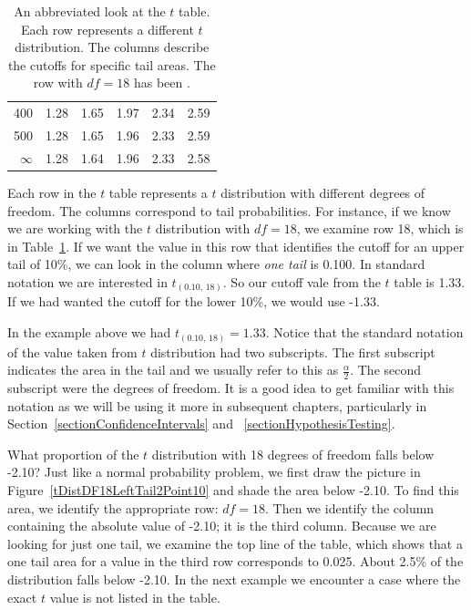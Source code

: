 \begin{table}[H]
\begin{tabular}{r | rrr rr}
400  &  {\normalsize  1.28} & {\normalsize  1.65} & {\normalsize  1.97} & {\normalsize  2.34} & {\normalsize  2.59}  \\ 
500  &  {\normalsize  1.28} & {\normalsize  1.65} & {\normalsize  1.96} & {\normalsize  2.33} & {\normalsize  2.59}  \\ 
$\infty$  &  {\normalsize  1.28} & {\normalsize  1.64} & {\normalsize  1.96} & {\normalsize  2.33} & {\normalsize  2.58}  \\ 
\end{tabular}
\caption{An abbreviated look at the $t$ table. Each row represents a different $t$ distribution. The columns describe the cutoffs for specific tail areas. The row with $df=18$ has been .}
\label{tTableSample}
\end{table}

Each row in the $t$ table represents a $t$ distribution with different degrees of freedom. The columns correspond to tail probabilities. For instance, if we know we are working with the $t$ distribution with $df=18$, 
we examine row 18, which is  in Table~\ref{tTableSample}. If we want the value in this row that identifies the cutoff for an upper tail of 10\%, we can look in the column where \emph{one tail} is 0.100. 
In standard notation we are interested in $t_{(0.10, \, 18)}$.
So our cutoff vale from the $t$ table is 1.33. 
If we had wanted the cutoff for the lower 10\%, we would use -1.33. 

In the example above we had $t_{(0.10, \, 18)} = 1.33$.
Notice that the standard notation of the value taken from $t$ distribution had two
subscripts.
The first subscript indicates the area in the tail and we usually refer to this as $\frac{\alpha}{2}$.
The second subscript were the degrees of freedom.
It is a good idea to get familiar with this notation as we will be using it more in subsequent chapters, 
particularly in Section~\ref{sectionConfidenceIntervals} and ~\ref{sectionHypothesisTesting}.

\begin{example}{What proportion of the $t$ distribution with 18 degrees of freedom falls below -2.10?}
Just like a normal probability problem, we first draw the picture in Figure~\ref{tDistDF18LeftTail2Point10} and shade the area below -2.10. To find this area, we identify the appropriate row: $df=18$. Then we identify the column containing the absolute value of -2.10; it is the third column. Because we are looking for just one tail, we examine the top line of the table, which shows that a one tail area for a value in the third row corresponds to 0.025. About 2.5\% of the distribution falls below -2.10. In the next example we encounter a case where the exact $t$ value is not listed in the table.
\end{example}

